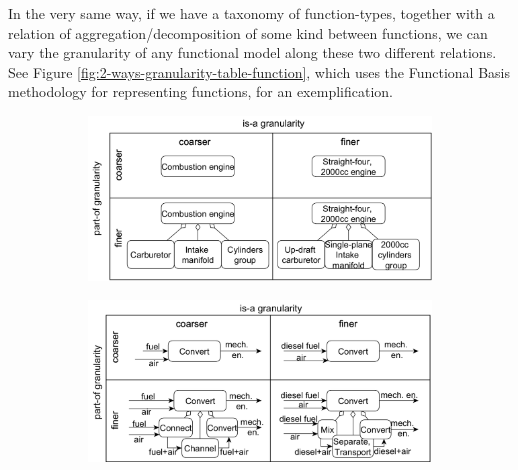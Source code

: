 \documentclass[
]{ceurart}
\begin{document}
In the very same way, if we have a taxonomy of function-types, together with a relation of aggregation/decomposition of some kind between functions, we can vary the granularity of any functional model along these two different relations. See Figure \ref{fig:2-ways-granularity-table-function}, which uses the Functional Basis methodology for representing functions, for an exemplification.

\begin{figure}
    \centering
    \begin{subfigure}{0.49\textwidth}
    \includegraphics[width=\textwidth]{granularity-table-structural.png}
    \caption{}
    \label{fig:granularity-table-structural}
    \end{subfigure}
    \hfill
    \begin{subfigure}{0.49\textwidth}
    \includegraphics[width=\textwidth]{granularity-table-functional.png}

\end{subfigure}
\end{figure}
\end{document}
